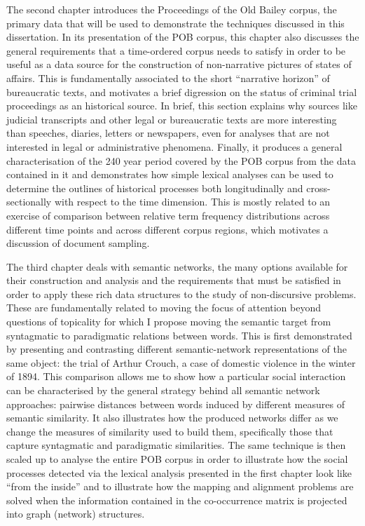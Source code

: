 The second chapter introduces the Proceedings of the Old Bailey corpus, the primary data that will be used to demonstrate the techniques discussed in this dissertation.
In its presentation of the POB corpus, this chapter also discusses the general requirements that a time-ordered corpus needs to satisfy in order to be useful as a data source for the construction of non-narrative pictures of states of affairs.
This is fundamentally associated to the short ``narrative horizon'' of bureaucratic texts, and motivates a brief digression on the status of criminal trial proceedings as an historical source.
In brief, this section explains why sources like judicial transcripts and other legal or bureaucratic texts are more interesting than speeches, diaries, letters or newspapers, even for analyses that are not interested in legal or administrative phenomena.
Finally, it produces a general characterisation of the 240 year period covered by the POB corpus from the data contained in it and demonstrates how simple lexical analyses can be used to determine the outlines of historical processes both longitudinally and cross-sectionally with respect to the time dimension.
This is mostly related to an exercise of comparison between relative term frequency distributions across different time points and across different corpus regions, which motivates a discussion of document sampling.

The third chapter deals with semantic networks, the many options available for their construction and analysis and the requirements that must be satisfied in order to apply these rich data structures to the study of non-discursive problems.
These are fundamentally related to moving the focus of attention beyond questions of topicality for which I propose moving the semantic target from syntagmatic to paradigmatic relations between words.
This is first demonstrated by presenting and contrasting different semantic-network representations of the same object: the trial of Arthur Crouch, a case of domestic violence in the winter of 1894.
This comparison allows me to show how a particular social interaction can be characterised by the general strategy behind all semantic network approaches: pairwise distances between words induced by different measures of semantic similarity.
It also illustrates how the produced networks differ as we change the measures of similarity used to build them, specifically those that capture syntagmatic and paradigmatic similarities.
The same technique is then scaled up to analyse the entire POB corpus in order to illustrate how the social processes detected via the lexical analysis presented in the first chapter look like ``from the inside'' and to illustrate how the mapping and alignment problems are solved when the information contained in the co-occurrence matrix is projected into graph (network) structures.

